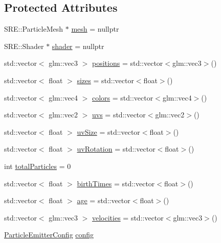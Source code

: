 \subsection*{Protected Attributes}
\begin{DoxyCompactItemize}
\item 
S\+R\+E\+::\+Particle\+Mesh $\ast$ \hyperlink{class_mason_1_1_particle_emitter_ab144b5872ad3b63652f8a079069f4cd0}{mesh} = nullptr
\item 
S\+R\+E\+::\+Shader $\ast$ \hyperlink{class_mason_1_1_particle_emitter_abd604dd44e85f836580c40bf8d147a2c}{shader} = nullptr
\item 
std\+::vector$<$ glm\+::vec3 $>$ \hyperlink{class_mason_1_1_particle_emitter_a9398d92e4bed89396c02d4c028ba3e69}{positions} = std\+::vector$<$glm\+::vec3$>$()
\item 
std\+::vector$<$ float $>$ \hyperlink{class_mason_1_1_particle_emitter_a6209f3a86719de038574edafc0eaa194}{sizes} = std\+::vector$<$float$>$()
\item 
std\+::vector$<$ glm\+::vec4 $>$ \hyperlink{class_mason_1_1_particle_emitter_a18c989ce7de75ba90f2b9f40f36beed1}{colors} = std\+::vector$<$glm\+::vec4$>$()
\item 
std\+::vector$<$ glm\+::vec2 $>$ \hyperlink{class_mason_1_1_particle_emitter_a6979395fb93878859edace9ab327dcc4}{uvs} = std\+::vector$<$glm\+::vec2$>$()
\item 
std\+::vector$<$ float $>$ \hyperlink{class_mason_1_1_particle_emitter_a9c2a9f3d9c113d2503598551c992fde4}{uv\+Size} = std\+::vector$<$float$>$()
\item 
std\+::vector$<$ float $>$ \hyperlink{class_mason_1_1_particle_emitter_a477934ce692453792d8be3ff51a3d22f}{uv\+Rotation} = std\+::vector$<$float$>$()
\item 
int \hyperlink{class_mason_1_1_particle_emitter_afc99ceabe0f61e289bc7e6d4c3b1b038}{total\+Particles} = 0
\item 
std\+::vector$<$ float $>$ \hyperlink{class_mason_1_1_particle_emitter_aa7e4b79447b8c65255b92d313464a03c}{birth\+Times} = std\+::vector$<$float$>$()
\item 
std\+::vector$<$ float $>$ \hyperlink{class_mason_1_1_particle_emitter_af8aa10f22ae7a4662b198d52c2424d3c}{age} = std\+::vector$<$float$>$()
\item 
std\+::vector$<$ glm\+::vec3 $>$ \hyperlink{class_mason_1_1_particle_emitter_aa72403d590c4528e1a1d9dbf4bc3dfd3}{velocities} = std\+::vector$<$glm\+::vec3$>$()
\item 
\hyperlink{struct_mason_1_1_particle_emitter_config}{Particle\+Emitter\+Config} \hyperlink{class_mason_1_1_particle_emitter_a86af1c5bfa7b301f334473b458d16ba0}{config}

\end{DoxyCompactItemize}
